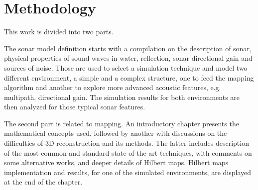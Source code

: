 

\section{Methodology}
 


% 


This work is divided into two parts.

The sonar model definition starts with a compilation on the description of
sonar, physical properties of sound waves in water, reflection, sonar
directional gain and sources of noise. Those are used to select a simulation
technique and model two different environment, a simple and a complex
structure, one to feed the mapping algorithm and another to explore more
advanced acoustic features, e.g. multipath, directional gain. The simulation
results for both environments are then analyzed for those typical sonar
features.

The second part is related to mapping. An introductory chapter presents
the mathematical concepts used, followed by another with discussions on the
difficulties of 3D reconstruction and its methods. The latter includes description
of the most common and standard state-of-the-art techniques, with comments on
some alternative works, and deeper details of Hilbert maps. Hilbert maps
implementation and results, for one of the simulated environments, are
displayed at the end of the chapter.



